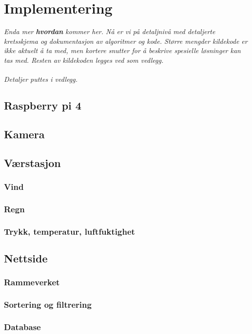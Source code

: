 \section{Implementering}
\label{sec:implementering}
\textit{Enda mer \textbf{hvordan} kommer her. Nå er vi på detaljnivå med detaljerte kretsskjema og dokumentasjon av algoritmer og kode. Større mengder kildekode er ikke aktuelt å ta med, men kortere snutter for å beskrive spesielle løsninger kan tas med. Resten av kildekoden legges ved som vedlegg. \\
\\
Detaljer puttes i vedlegg.}



\subsection{Raspberry pi 4}



\subsection{Kamera}


\subsection{Værstasjon}

\subsubsection{Vind}

\subsubsection{Regn}

\subsubsection{Trykk, temperatur, luftfuktighet}

\subsection{Nettside}

\subsubsection{Rammeverket}

\subsubsection{Sortering og filtrering}

\subsubsection{Database}

